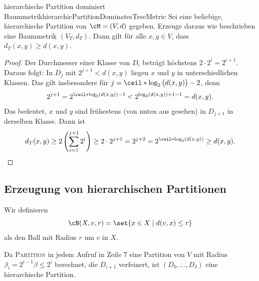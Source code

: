 \documentclass[language=ngerman,algolist]{TemplateLecture}
\begin{document}
\begin{lem}{hierarchische Partition dominiert Baummetrik}{hierarchicPartitionDominatesTreeMetric}
    Sei eine beliebige, hierarchische Partition von $\cM = (V, d)$ gegeben. Erzeuge daraus wie beschrieben eine Baummetrik $(V_T, d_T)$. Dann gilt für alle $x, y \in V$, dass $d_T(x,y) \geq d(x,y)$. 
\end{lem}
\begin{proof}
    Der Durchmesser einer Klasse von $D_i$ beträgt höchstens $2 \cdot 2^i = 2^{i+1}$. Daraus folgt: In $D_j$ mit $2^{j+1} < d(x,y)$ liegen $x$ und $y$ in unterschiedlichen Klassen. Das gilt insbesondere für $j = \ceil*{\log_2\big(d(x,y)\big)} - 2$, denn 
    \begin{equation*}
        2^{j+1} = 2^{\ceil*{\log_2(d(x,y))} - 1} < 2^{\log_2(d(x,y)) + 1 - 1} = d(x,y).
    \end{equation*}
    Das bedeutet, $x$ und $y$ sind frühestens (von unten aus gesehen) in $D_{j+1}$ in derselben Klasse. Dann ist 
    \begin{equation*}
        d_T(x,y) \geq 2\left( \sum_{i = 1}^{j+1} 2^i \right) \geq 2 \cdot 2^{j+1} = 2^{j+2} = 2^{\ceil*{\log_2(d(x,y))}} \geq d(x,y).\qedhere
    \end{equation*}
\end{proof}

\subsection{Erzeugung von hierarchischen Partitionen}

Wir definieren
\begin{equation*}
    \cB(X, v, r) = \set{x \in X \mid d(v,x) \leq r}
\end{equation*}
als den Ball mit Radius $r$ um $v$ in $X$.

\begin{algorithm}[h]
    \caption{\textsc{HierPart}}\label{alg:hierPart}
    \begin{algorithmic}[1]
            \Else{}
            \EndIf{}
        \EndFor{}
    \end{algorithmic}
\end{algorithm}
Da \textsc{Partition} in jedem Aufruf in Zeile $7$ eine Partition von $V$ mit Radius $\beta_i = 2^{i-1}\beta \leq 2^i$ berechnet, die $D_{i+1}$ verfeinert, ist $(D_0, \ldots, D_\delta)$ eine hierarchische Partition.
\end{document}
